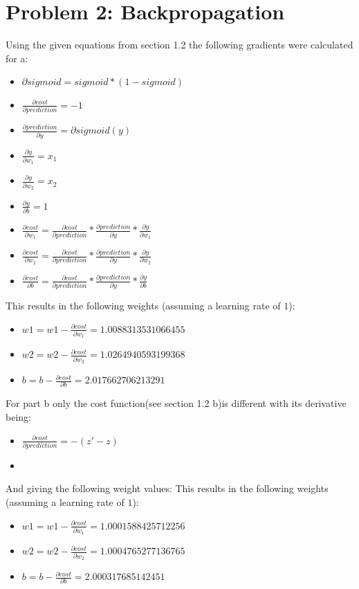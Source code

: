 \section{Problem 2: Backpropagation}
Using the given equations from section 1.2 the following gradients were calculated for a:
\begin{itemize}
\item  $\partial sigmoid = sigmoid*(1-sigmoid)$
\item  $\frac {\partial cost}{\partial prediction} = -1 $
\item  $\frac {\partial prediction}{\partial y} = \partial sigmoid(y)$ 
\item  $\frac {\partial y}{\partial w_1}=x_1$
\item  $\frac {\partial y}{\partial w_2}=x_2$
\item  $\frac {\partial y}{\partial b}=1$
\item  $\frac {\partial cost}{\partial w_1}=\frac {\partial cost}{\partial prediction}*\frac {\partial prediction}{\partial y}*\frac {\partial y}{\partial w_1}$
\item  $\frac {\partial cost}{\partial w_2}=\frac {\partial cost}{\partial prediction}*\frac {\partial prediction}{\partial y}*\frac {\partial y}{\partial w_2}$
\item  $\frac {\partial cost}{\partial b}=\frac {\partial cost}{\partial prediction}*\frac {\partial prediction}{\partial y}*\frac {\partial y}{\partial b}$
\end{itemize}
This results in the following weights (assuming a learning rate of $1$):
\begin{itemize}
\item $w1 = w1-\frac {\partial cost}{\partial w_1} = 1.0088313531066455$
\item $w2 = w2 - \frac {\partial cost}{\partial w_2}=1.0264940593199368$\\
\item $b = b - \frac {\partial cost}{\partial b}=2.017662706213291$
\end{itemize}
For part b only the cost function(see section 1.2 b)is different with its derivative being:
\begin{itemize}
\item $\frac {\partial cost}{\partial prediction} = -(z'-z)$
\item 
\end{itemize}
And giving the following weight values:
This results in the following weights (assuming a learning rate of $1$):
\begin{itemize}
\item $w1 = w1-\frac {\partial cost}{\partial w_1} = 1.0001588425712256$
\item $w2 = w2 - \frac {\partial cost}{\partial w_2}=1.0004765277136765$\\
\item $b = b - \frac {\partial cost}{\partial b}=2.000317685142451$
\end{itemize}
